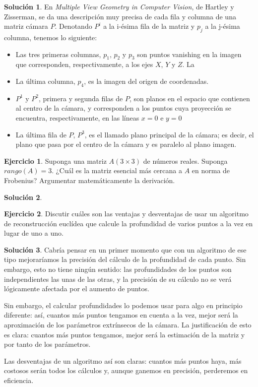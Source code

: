 \documentclass[a4paper, 11pt]{article}
\theoremstyle{definition}
\newtheorem{ejercicio}{Ejercicio}
\newtheorem*{solucion}{Solución}
\theoremstyle{theorem}
\begin{document}
    \begin{solucion}
        En \emph{Multiple View Geometry in Computer Vision}, de Hartley y Zisserman, se da una descripción muy precisa de cada fila y columna de una matriz cámara $P$. Denotando $P^i$ a la i-ésima fila de la matriz y $p_j$ a la j-ésima columna, tenemos lo siguiente:
        \begin{itemize}
            \item Las tres primeras columnas, $p_1$, $p_2$ y $p_3$ son puntos vanishing en la imagen que corresponden, respectivamente, a los ejes $X$, $Y$ y $Z$. La \item La última columna, $p_4$, es la imagen del origen de coordenadas.
            \item $P^1$ y $P^2$, primera y segunda filas de $P$, son planos en el espacio que contienen al centro de la cámara, y corresponden a los puntos cuya proyección se encuentra, respectivamente, en las líneas $x=0$ e $y=0$
            \item La última fila de $P$, $P^3$, es el llamado plano principal de la cámara; es decir, el plano que pasa por el centro de la cámara y es paralelo al plano imagen.
        \end{itemize}
    \end{solucion}

    \begin{ejercicio}
        Suponga una matriz $A(3\times3)$ de números reales. Suponga $rango(A)=3$. ¿Cuál es la matriz esencial más cercana a $A$ en norma de Frobenius? Argumentar matemáticamente la derivación.
    \end{ejercicio}

    \begin{solucion}

    \end{solucion}

    \begin{ejercicio}
        Discutir cuáles son las ventajas y desventajas de usar un algoritmo de reconstrucción euclídea que calcule la profundidad de varios puntos a la vez en lugar de uno a uno.
    \end{ejercicio}

    \begin{solucion}
        Cabría pensar en un primer momento que con un algoritmo de ese tipo mejoraríamos la precisión del cálculo de la profundidad de cada punto. Sin embargo, esto no tiene ningún sentido: las profundidades de los puntos son independientes las unas de las otras, y la precisión de su cálculo no se verá lógicamente afectada por el aumento de puntos.

        Sin embargo, el calcular profundidades lo podemos usar para algo en principio diferente: así, cuantos más puntos tengamos en cuenta a la vez, mejor será la aproximación de los parámetros extrínsecos de la cámara. La justificación de esto es clara: cuantos más puntos tengamos, mejor será la estimación de la matriz y por tanto de los parámetros.

        Las desventajas de un algoritmo así son claras: cuantos más puntos haya, más costosos serán todos los cálculos y, aunque ganemos en precisión, perderemos en eficiencia.
    \end{solucion}
\end{document}
